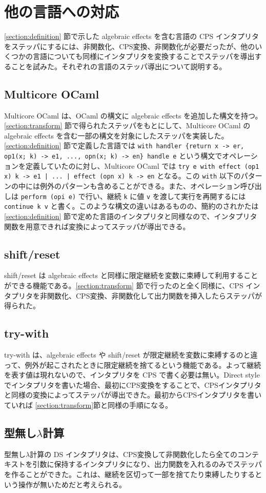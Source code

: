 \section{他の言語への対応}
\label{section:languages}

\ref{section:definition} 節で示した algebraic effects を含む言語の CPS インタプリタをステッパにするには、非関数化、CPS変換、非関数化が必要だったが、他のいくつかの言語についても同様にインタプリタを変換することでステッパを導出することを試みた。それぞれの言語のステッパ導出について説明する。

\subsection{Multicore OCaml}
\label{subsection:multicore_ocaml}

Multicore OCaml は、OCaml の構文に algebraic effects を追加した構文を持つ。\ref{section:transform} 節で得られたステッパをもとにして、Multicore OCaml の algebraic effects を含む一部の構文を対象にしたステッパを実装した。\ref{section:definition} 節で定義した言語では \texttt{with handler \{return x -> er, op1(x; k) -> e1, ..., opn(x; k) -> en\} handle e} という構文でオペレーションを定義していたのに対し、Multicore OCaml では \texttt{try e with effect (op1 x) k -> e1 | ... | effect (opn x) k -> en} となる。この \texttt{with} 以下のパターンの中には例外のパターンも含めることができる。また、オペレーション呼び出しは \texttt{perform (opi e)} で行い、継続 \texttt{k} に値 \texttt{v} を渡して実行を再開するには \texttt{continue k v} と書く。このような構文の違いはあるものの、簡約のされかたは \ref{section:definition} 節で定めた言語のインタプリタと同様なので、インタプリタ関数を用意できれば変換によってステッパが導出できる。

\subsection{shift/reset}
\label{subsection:shift/reset}

shift/reset は algebraic effects と同様に限定継続を変数に束縛して利用することができる機能である。\ref{section:transform} 節で行ったのと全く同様に、CPS インタプリタを非関数化、CPS変換、非関数化して出力関数を挿入したらステッパが得られた。

\subsection{try-with}
\label{subsection:try_with}

try-with は、algebraic effects や shift/reset が限定継続を変数に束縛するのと違って、例外が起こされたときに限定継続を捨てるという機能である。よって継続を表す値は現れないので、インタプリタを CPS で書く必要は無い。Direct style でインタプリタを書いた場合、最初にCPS変換をすることで、CPSインタプリタと同様の変換によってステッパが導出できた。最初からCPSインタプリタを書いていれば \ref{section:transform}節と同様の手順になる。

\subsection{型無し$\lambda$計算}
\label{subsection:lambda}

型無し$\lambda$計算の DS インタプリタは、CPS変換して非関数化したら全てのコンテキストを引数に保持するインタプリタになり、出力関数を入れるのみでステッパを作ることができた。これは、継続を区切って一部を捨てたり束縛したりするという操作が無いためだと考えられる。
